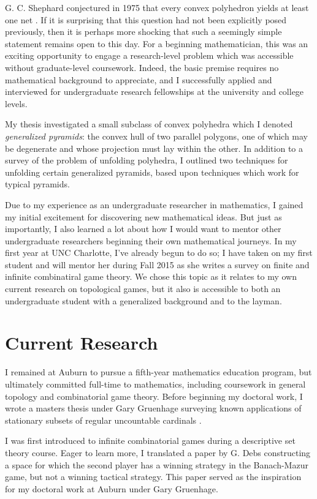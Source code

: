 \documentclass[11pt]{amsart}
\theoremstyle{plain}
\newcommand{\<}{\langle}
\renewcommand{\>}{\rangle}
\newcommand{\term}{\textit}
\begin{document}
G. C. Shephard conjectured in 1975 that every convex polyhedron yields at least
one net \cite{MR0390915}. If it is surprising that this question had
not been explicitly posed previously, then it is perhaps more shocking that
such a seemingly simple statement remains open to this day. For a beginning
mathematician, this was an exciting opportunity to engage a research-level
problem which was accessible without graduate-level coursework.
Indeed, the basic premise requires no mathematical background to appreciate,
and I successfully applied and interviewed for undergraduate research
fellowships at the university and college levels.

My thesis investigated a small subclass of convex polyhedra which I denoted
\term{generalized pyramids}: the convex hull of two parallel polygons, one of
which may be degenerate and whose projection must lay within the other.
In addition to a survey of the problem of unfolding polyhedra, I outlined
two techniques for unfolding certain generalized pyramids, based upon
techniques which work for typical pyramids.

Due to my experience as an undergraduate researcher in mathematics, I gained
my initial excitement for discovering new mathematical ideas. But just as
importantly, I also learned a lot about how I would want to mentor other
undergraduate researchers beginning their own mathematical journeys. In my
first year at UNC Charlotte, I've already begun to do so; I have taken
on my first student and will mentor her during Fall 2015
as she writes a survey on finite and infinite combinatiral game theory. We
chose this topic as it relates to my own current research on topological
games, but it also is accessible to both an undergraduate student with a
generalized background and to the layman.


\section*{Current Research}

I remained at Auburn to pursue a fifth-year mathematics education program,
but ultimately committed full-time to mathematics, including coursework in
general topology and combinatorial game theory. Before beginning my doctoral
work, I wrote a masters thesis
under Gary Gruenhage surveying known applications of stationary subsets of
regular uncountable cardinals \cite{MASTERS}.

I was first introduced to infinite combinatorial games during a descriptive
set theory course. Eager to learn more, I translated a paper by G. Debs
\cite{MR817083} constructing a space for which the second player has a winning
strategy in the Banach-Mazur game, but not a winning tactical
strategy. This paper served as the inspiration for my doctoral work at
Auburn under Gary Gruenhage.
\end{document}
